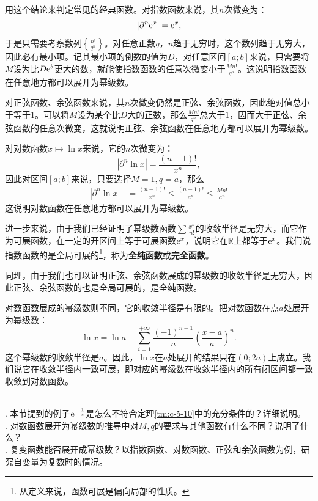 \documentclass[12pt,UTF8]{ctexbook}
\begin{document}
\begin{appendix}
用这个结论来判定常见的经典函数。对指数函数来说，其$n$次微变为：
$$ |\partial^n \mathrm{e}^x| = \mathrm{e}^x, $$
于是只需要考察数列$\left\{\frac{n!}{q^n}\right\}$。对任意正数$q$，$n$趋于无穷时，这个数列趋于无穷大，因此必有最小项。记其最小项的倒数的值为$D$，对任意区间$[a;b]$来说，只需要将$M$设为比$D\mathrm{e}^b$更大的数，就能使指数函数的任意次微变小于$\frac{M n!}{q^n}$。这说明指数函数在任意地方都可以展开为幂级数。

对正弦函数、余弦函数来说，其$n$次微变仍然是正弦、余弦函数，因此绝对值总小于等于$1$。可以将$M$设为某个比$D$大的正数，那么$\frac{M n!}{q^n}$总大于$1$，因而大于正弦、余弦函数的任意次微变，这就说明正弦、余弦函数在任意地方都可以展开为幂级数。

对对数函数$x\mapsto \ln{x}$来说，它的$n$次微变为：
$$ |\partial^n \ln{x}| = \frac{(n - 1)!}{x^n}, $$
因此对区间$[a;b]$来说，只要选择$M=1,q=a$，那么
\begin{align*}
    |\partial^n \ln{x}| &= \frac{(n - 1)!}{x^n} \leqslant \frac{(n - 1)!}{a^n} \leqslant \frac{M n!}{a^n}
\end{align*}
这说明对数函数在任意地方都可以展开为幂级数。

进一步来说，由于我们已经证明了幂级数函数$\sum \frac{x^n}{n!}$的收敛半径是无穷大，而它作为可展函数，在一定的开区间上等于可展函数$\mathrm{e}^x$，说明它在$\mathbb{R}$上都等于$\mathrm{e}^x$。我们说指数函数的是全局可展的\footnote{从定义来说，函数可展是偏向局部的性质。}，称为\textbf{全纯函数}或\textbf{完全函数}。

同理，由于我们也可以证明正弦、余弦函数展成的幂级数的收敛半径是无穷大，因此正弦、余弦函数的也是全局可展的，是全纯函数。

对数函数展成的幂级数则不同，它的收敛半径是有限的。把对数函数在点$a$处展开为幂级数：
$$ \ln{x} = \ln{a} + \sum_{i=1}^{+\infty} \frac{(-1)^{n-1}}{n} \left(\frac{x - a}{a}\right)^n. $$
这个幂级数的收敛半径是$a$。因此，$\ln{x}$在$a$处展开的结果只在$(0;2a)$上成立。我们说它在收敛半径内一致可展，即对应的幂级数在收敛半径内的所有闭区间都一致收敛到对数函数。

\begin{sk}
    \mbox{} \\
    . 本节提到的例子$\mathrm{e}^{-\frac{1}{x}}$是怎么不符合定理\ref{tm:c-5-10}中的充分条件的？详细说明。\\
    . 对数函数展开为幂级数的推导中对$M,q$的要求与其他函数有什么不同？说明了什么？\\
    . 复变函数能否展开成幂级数？以指数函数、对数函数、正弦和余弦函数为例，研究自变量为复数时的情况。
\end{sk}


\end{appendix}
\end{document}
